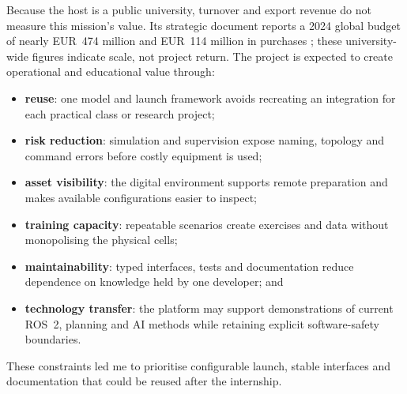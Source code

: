 Because the host is a public university, turnover and export revenue do not
measure this mission's value. Its strategic document reports a 2024 global
budget of nearly EUR~474 million and EUR~114 million in purchases
\citep[p.~5]{univtoulousefigures}; these university-wide figures indicate
scale, not project return. The project is expected to create operational and
educational value through:

\begin{itemize}
  \setlength{\itemsep}{0.28\baselineskip}
  \item \textbf{reuse}: one model and launch framework avoids recreating an
  integration for each practical class or research project;
  \item \textbf{risk reduction}: simulation and supervision expose naming,
  topology and command errors before costly equipment is used;
  \item \textbf{asset visibility}: the digital environment supports remote
  preparation and makes available configurations easier to inspect;
  \item \textbf{training capacity}: repeatable scenarios create exercises and
  data without monopolising the physical cells;
  \item \textbf{maintainability}: typed interfaces, tests and documentation
  reduce dependence on knowledge held by one developer; and
  \item \textbf{technology transfer}: the platform may support demonstrations
  of current ROS~2, planning and AI methods while retaining explicit
  software-safety boundaries.
\end{itemize}

These constraints led me to prioritise configurable launch, stable interfaces
and documentation that could be reused after the internship.
